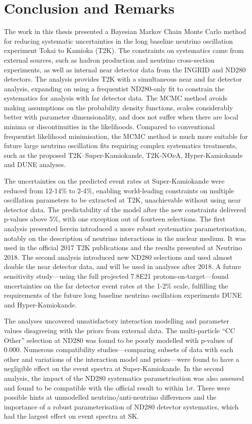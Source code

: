 \chapter{Conclusion and Remarks}
\label{chap:conclusion}
The work in this thesis presented a Bayesian Markov Chain Monte Carlo method for reducing systematic uncertainties in the long baseline neutrino oscillation experiment Tokai to Kamioka (T2K). The constraints on systematics came from external sources, such as hadron production and neutrino cross-section experiments, as well as internal near detector data from the INGRID and ND280 detectors. The analysis provides T2K with a simultaneous near and far detector analysis, expanding on using a frequentist ND280-only fit to constrain the systematics for analysis with far detector data. The MCMC method avoids making assumptions on the probability density functions, scales considerably better with parameter dimensionality, and does not suffer when there are local minima or discontinuities in the likelihoods. Compared to conventional frequentist likelihood minimisation, the MCMC method is much more suitable for future large neutrino oscillation fits requiring complex systematics treatments, such as the proposed T2K--Super-Kamiokande, T2K-NO$\nu$A, Hyper-Kamiokande and DUNE analyses.

The uncertainties on the predicted event rates at Super-Kamiokande were reduced from 12-14\% to 2-4\%, enabling world-leading constraints on multiple oscillation parameters to be extracted at T2K, unachievable without using near detector data. The predictability of the model after the new constraints delivered p-values above 5\%, with one exception out of fourteen selections. The first analysis presented herein introduced a more robust systematics parameterisation, notably on the description of neutrino interactions in the nuclear medium. It was used in the official 2017 T2K publications and the results presented at Neutrino 2018. The second analysis introduced new ND280 selections and used almost double the near detector data, and will be used in analyses after 2018. A future sensitivity study---using the full projected 7.8E21 protons-on-target---found uncertainties on the far detector event rates at the 1-2\% scale, fulfilling the requirements of the future long baseline neutrino oscillation experiments DUNE and Hyper-Kamiokande.

The analyses uncovered unsatisfactory interaction modelling and parameter values disagreeing with the priors from external data. The multi-particle ``CC Other'' selection at ND280 was found to be poorly modelled with p-values of 0.000. Numerous compatibility studies---comparing subsets of data with each other and variations of the interaction model and priors---were found to have a negligible effect on the event spectra at Super-Kamiokande. In the second analysis, the impact of the ND280 systematics parametrisation was also assessed and found to be compatible with the official result to within $1\sigma$. There were possible hints at unmodelled neutrino/anti-neutrino differences and the importance of a robust parameterisation of ND280 detector systematics, which had the largest effect on event spectra at SK.

